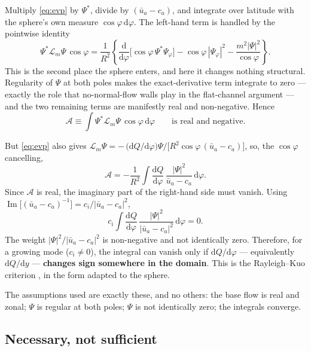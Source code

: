 \documentclass[11pt,a4paper]{article}
\newcommand{\dd}{\mathrm{d}}
\begin{document}
Multiply \eqref{eq:evp} by $\Psi^{*}$, divide by $(\bar u_a - c_a)$, and
integrate over latitude with the sphere's own measure $\cos\varphi\,\dd\varphi$.
The left-hand term is handled by the pointwise identity
%
\begin{equation}
\Psi^{*}\mathcal{L}_m\Psi\,\cos\varphi
= \frac{1}{R^2}\left\{
  \frac{\dd}{\dd\varphi}\Big[\cos\varphi\,\Psi^{*}\Psi_\varphi\Big]
  - \cos\varphi\,|\Psi_\varphi|^2
  - \frac{m^2|\Psi|^2}{\cos\varphi}\right\} .
\label{eq:byparts}
\end{equation}
%
This is the second place the sphere enters, and here it changes nothing
structural. Regularity of $\Psi$ at both poles makes the exact-derivative term
integrate to zero --- exactly the role that no-normal-flow walls play in the
flat-channel argument --- and the two remaining terms are manifestly real and
non-negative. Hence
%
\begin{equation}
\mathcal{A} \equiv \int \Psi^{*}\mathcal{L}_m\Psi\,\cos\varphi\,\dd\varphi
\qquad\text{is real and negative.}
\label{eq:Areal}
\end{equation}

But \eqref{eq:evp} also gives
$\mathcal{L}_m\Psi = -\,\big(\dd Q/\dd\varphi\big)\Psi
/\big[R^2\cos\varphi\,(\bar u_a - c_a)\big]$, so, the $\cos\varphi$ cancelling,
%
\begin{equation}
\mathcal{A} = -\frac{1}{R^2}\int
  \frac{\dd Q}{\dd\varphi}\,
  \frac{|\Psi|^2}{\bar u_a - c_a}\,\dd\varphi .
\label{eq:Asecond}
\end{equation}
%
Since $\mathcal{A}$ is real, the imaginary part of the right-hand side must
vanish. Using
$\operatorname{Im}\big[(\bar u_a - c_a)^{-1}\big]
 = c_i/|\bar u_a - c_a|^2$,
%
\begin{equation}
c_i \int \frac{\dd Q}{\dd\varphi}\,
   \frac{|\Psi|^2}{|\bar u_a - c_a|^2}\,\dd\varphi = 0 .
\label{eq:rk}
\end{equation}
%
The weight $|\Psi|^2/|\bar u_a - c_a|^2$ is non-negative and not identically
zero. Therefore, for a growing mode ($c_i \neq 0$), the integral can vanish only
if $\dd Q/\dd\varphi$ --- equivalently $\dd Q/\dd y$ --- \textbf{changes sign
somewhere in the domain}. This is the Rayleigh--Kuo criterion \citep{kuo1949},
in the form adapted to the sphere.

The assumptions used are exactly these, and no others: the base flow is real and
zonal; $\Psi$ is regular at both poles; $\Psi$ is not identically zero; the
integrals converge.

\subsection{Necessary, not sufficient}
\end{document}
